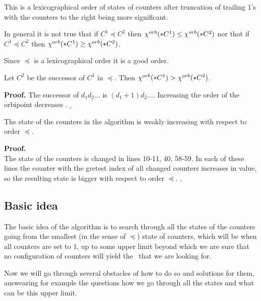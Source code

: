 This is a lexicographical order 
of states of counters after truncation of trailing 1's 
with the counters to the right being more significant. 

\begin{observation}
In general it is not true that if $C^1 \preceq C^2$ then 
${\chi^{orb}(*C^1)} \leq {\chi^{orb}(*C^2)}$ nor that if $C^1 \preceq C^2$ then 
${\chi^{orb}(*C^1)} \geq {\chi^{orb}(*C^2)}$.
\end{observation}

\begin{observation}
Since $\preceq$ is a lexicographical order it is a good order. 
\end{observation}

\begin{observation}\label{Successor lemma}
Let $C^2$ be the successor of $C^1$ in $\preceq$. Then ${\chi^{orb}(*C^1)} > {\chi^{orb}(*C^2)}$.
\end{observation}
\textbf{Proof.}
The successor of $d_1d_2\dots$ is $(d_1+1)d_2\dots$. Increasing the order of the orbipoint  
decreases \Eoc. $_\square$

\begin{lemma}

\end{lemma}

\begin{lemma}
The state of the counters in the algorithm is weakly increasing with respect to order $\preceq$. 
\end{lemma}
\textbf{Proof.} \\
The state of the counters is changed in lines 10-11, 40, 58-59. In each of these lines 
the counter with the gretest index of all changed counters increases in value, so 
the resulting state is bigger with respect to order $\preceq$. $_\square$

\subsection{Basic idea}
The basic idea of the algorithm is to search through all the states of the counters going 
from the smallest (in the sense of $\preceq$) state of counters, which will be when all counters 
are set to $1$, up to some upper limit beyond which we are sure that no configuration of 
counters will yield the \Eoc\ that we are looking for. 

Now we will go through several obstacles of how to do so and solutions for them, answearing for 
example the 
questions how we go through all the states and what can be this upper limit. 

